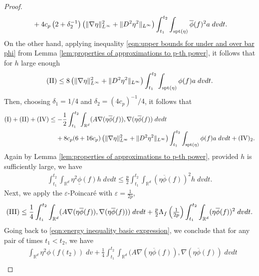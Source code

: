 \documentclass[12pt,american]{amsart}
\numberwithin{equation}{section}
\theoremstyle{plain}
\theoremstyle{definition}                  %
\begin{document}
\begin{proof}
\begin{align*}
      & \;\;\;\;+4c_p\left  ( 2+\delta_2^{-1}\right )\left (\|\nabla \eta\|_{L^\infty}^2+\|D^2\eta^2\|_{L^\infty} \right )\int_{t_1}^{t_2}\int_{\textnormal{spt}(\eta)}\overline{\phi}(f)^2a\;dvdt.
    \end{align*}
    On the other hand, applying inequality \eqref{eqn:upper bounds for under and over bar phi} from Lemma \ref{lem:properties of approximations to p-th power}, it follows that for $h$ large enough
    \begin{align*}
      (\textnormal{II}) \leq 8\left ( \|\nabla \eta\|_{L^\infty}^2 + \|D^2\eta^2\|_{L^\infty} \right )\int_{t_1}^{t_2}\int_{\textnormal{spt}(\eta)}\phi(f)a\;dvdt.	  
    \end{align*}	  
    Then, choosing $\delta_1 = 1/4$ and $\delta_2 = (4c_p)^{-1}/4$, it follows that
    \begin{align*}
      (\textnormal{I})+(\textnormal{II})+(\textnormal{IV}) & \leq -\frac{1}{2}\int_{t_1}^{t_2}\int_{\mathbb{R}^d}(A\nabla (\eta \overline{\phi}(f)),\nabla (\eta \overline{\phi}(f) )\;dvdt\\
      & \;\;\;\;+8c_p(6+16 c_p )\left (\|\nabla \eta\|_{L^\infty}^2+\|D^2\eta^2\|_{L^\infty} \right )\int_{t_1}^{t_2}\int_{\textnormal{spt}(\eta)}\phi(f)a\;dvdt+(\textnormal{IV})_2.			
    \end{align*}
    Again by Lemma \ref{lem:properties of approximations to p-th power}, provided $h$ is sufficiently large, we have
    \begin{align*}
      \int_{t_1}^{t_2}\int_{\mathbb{R}^d}\eta^2 \underline{\phi}(f)h\;dvdt \leq \frac{p}{2}\int_{t_1}^{t_2}\int_{\mathbb{R}^d} (\eta \overline{\phi}(f))^2h\;dvdt.
    \end{align*}
    Next, we apply the $\varepsilon$-Poincar\'e with $\varepsilon = \frac{1}{2p}$,
    \begin{align*}
      (\textnormal{III}) \leq \frac{1}{4}\int_{t_1}^{t_2}\int_{\mathbb{R}^d}(A\nabla (\eta \overline{\phi}(f)),\nabla (\eta \overline{\phi}(f)))\;dvdt+\tfrac{p}{2}\Lambda_f \left ( \tfrac{1}{2p} \right )\int_{t_1}^{t_2}\int_{\mathbb{R}^d}(\eta \overline{\phi}(f))^2\;dvdt.
    \end{align*}
    Going back to \eqref{eqn:energy inequality basic expression}, we conclude that for any pair of times $t_1<t_2$, we have 
    \begin{align*}
      & \int_{\mathbb{R}^d}\eta^2 \phi(f(t_2))\;dv + \frac{1}{4}\int_{t_1}^{t_2}\int_{\mathbb{R}^d}(A\nabla (\eta \overline{\phi}(f)),\nabla (\eta \overline{\phi}(f) )\;dvdt \\

\end{align*}
\end{proof}
\end{document}
